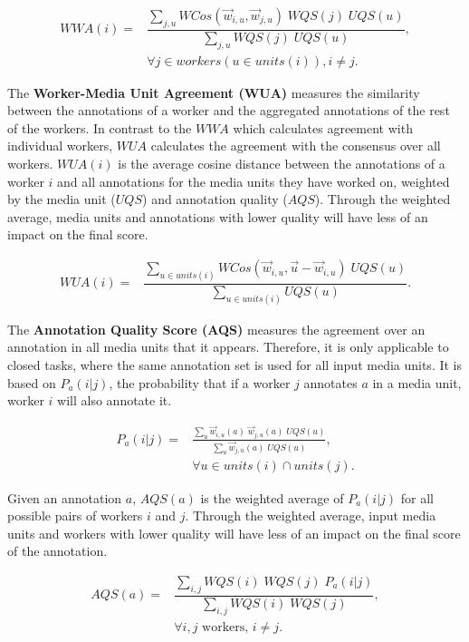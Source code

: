 \begin{align}
 WWA(i) = & \dfrac{ \sum\limits_{j, u} WCos(\vec{w}_{i,u} , \vec{w}_{j,u}) \; WQS(j) \; UQS(u) }{ \sum\limits_{j, u} WQS(j) \; UQS(u) }, \\
& \forall j \in workers(u \in units(i)), i \neq j . \nonumber
\end{align}

The \textbf{Worker-Media Unit Agreement (WUA)} measures the similarity between the annotations of a worker and the aggregated annotations of the rest of the workers. In contrast to the $WWA$ which calculates agreement with individual workers, $WUA$ calculates the agreement with the consensus over all workers. $WUA(i)$ is the average cosine distance between the annotations of a worker $i$ and all annotations for the media units they have worked on, weighted by the media unit ($UQS$) and annotation quality ($AQS$). Through the weighted average, media units and annotations with lower quality will have less of an impact on the final score.

\begin{align}
WUA(i) = & \dfrac{\sum\limits_{u \in units(i)} WCos(\vec{w}_{i,u} , \vec{u} - \vec{w}_{i,u}) \; UQS(u)}{\sum\limits_{u \in units(i)} UQS(u)}.
\end{align}

The \textbf{Annotation Quality Score (AQS)} measures the agreement over an annotation in all media units that it appears. Therefore, it is only applicable to closed tasks, where the same annotation set is used for all input media units. It is based on $P_a(i | j)$, the probability that if a worker $j$ annotates $a$ in a media unit, worker $i$ will also annotate it.

\begin{align}
P_a(i | j) = & \frac{ \sum\limits_{u} \vec{w}_{i,u}(a) \; \vec{w}_{j,u}(a) \; UQS(u)}{ \sum\limits_{u} \vec{w}_{j, u}(a) \;  UQS(u) }, \\
& \forall u \in units(i) \cap units(j). \nonumber
\end{align}

Given an annotation $a$, $AQS(a)$ is the weighted average of $P_a(i | j)$ for all possible pairs of workers $i$ and $j$. Through the weighted average, input media units and workers with lower quality will have less of an impact on the final score of the annotation.

\begin{align}
AQS(a) = & \dfrac{ \sum\limits_{i,j} WQS(i) \; WQS(j) \; P_a(i | j) }{ \sum\limits_{i,j} WQS(i) \; WQS(j) }, \\
& \forall i, j \text{ workers, }  i \neq j . \nonumber
\end{align}

